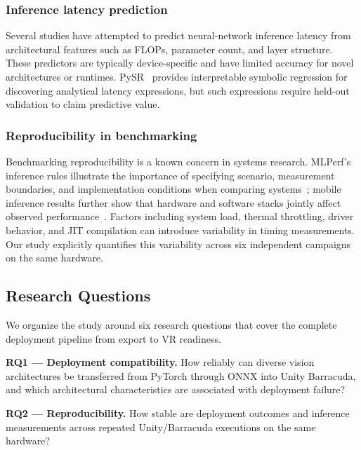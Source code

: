 \documentclass[10pt,twocolumn]{article}
\begin{document}
\subsubsection{Inference latency prediction}

Several studies have attempted to predict neural-network inference latency from architectural features such as FLOPs, parameter count, and layer structure. These predictors are typically device-specific and have limited accuracy for novel architectures or runtimes. PySR~\cite{cranmer2023pysr} provides interpretable symbolic regression for discovering analytical latency expressions, but such expressions require held-out validation to claim predictive value.

\subsubsection{Reproducibility in benchmarking}

Benchmarking reproducibility is a known concern in systems research. MLPerf's inference rules illustrate the importance of specifying scenario, measurement boundaries, and implementation conditions when comparing systems~\cite{reddi2020mlperf}; mobile inference results further show that hardware and software stacks jointly affect observed performance~\cite{reddi2020mobile}. Factors including system load, thermal throttling, driver behavior, and JIT compilation can introduce variability in timing measurements. Our study explicitly quantifies this variability across six independent campaigns on the same hardware.

\subsection{Research Questions}\label{sec:rqs}

We organize the study around six research questions that cover the complete deployment pipeline from export to VR readiness.

\medskip
\noindent\textbf{RQ1 --- Deployment compatibility.}
How reliably can diverse vision architectures be transferred from PyTorch through ONNX into Unity Barracuda, and which architectural characteristics are associated with deployment failure?

\noindent\textbf{RQ2 --- Reproducibility.}
How stable are deployment outcomes and inference measurements across repeated Unity/Barracuda executions on the same hardware?
\end{document}
